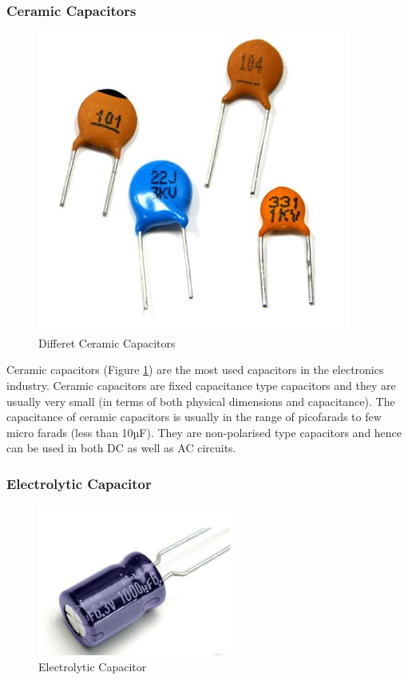 		\subsubsection{Ceramic Capacitors}
			\begin{figure}[h]
				\centering
				\includegraphics[width=0.5\linewidth]{img/exp2/5}
				\caption{Differet Ceramic Capacitors}
				\label{fig:5}
			\end{figure}
			
			Ceramic capacitors (Figure \ref{fig:5}) are the most used capacitors in the electronics industry. Ceramic capacitors are fixed capacitance type capacitors and they are usually very small (in terms of both physical dimensions and capacitance). The capacitance of ceramic capacitors is usually in the range of picofarads to few micro farads (less than 10µF). They are non-polarised type capacitors and hence can be used in both DC as well as AC circuits.
			
		\subsubsection{Electrolytic Capacitor}
			\begin{figure}[h]
				\centering
				\includegraphics[width=0.5\linewidth]{img/exp2/1}
				\caption{Electrolytic Capacitor}
				\label{fig:6}
			\end{figure}
			
